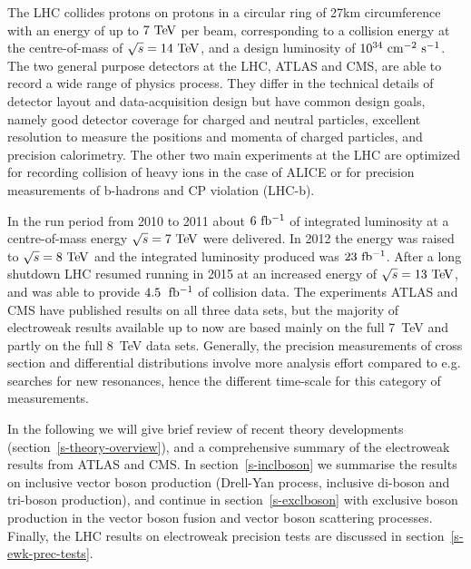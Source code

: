 The LHC collides protons on protons in a circular ring of 27\;km 
circumference with an energy of up to $7\TeV$ per beam, corresponding
to a collision energy at the centre-of-mass of $\rts=14\TeV$, and a 
design luminosity of $10^{34}\cm^{-2}\s^{-1}$. 
The two general purpose detectors at the LHC, ATLAS and CMS, are able to
record a wide range of physics process. They differ in the technical details of detector
layout and data-acquisition design but have common design goals, namely 
good detector coverage for charged and neutral particles, excellent resolution to measure
the positions and momenta of charged particles, and precision calorimetry. The other two
main experiments at the LHC are optimized for recording collision of heavy ions in the 
case of ALICE or for precision measurements of b-hadrons and CP violation (LHC-b).

In the run period from 2010 to 2011 about $6\mbox{\ fb$^{-1}$}$ of integrated
luminosity at a centre-of-mass energy $\rts=7\TeV$ were delivered. In 
2012 the energy was raised to $\rts=8\TeV$ and the integrated luminosity 
produced was $23\mbox{\ fb$^{-1}$}$. 
After a long shutdown LHC resumed running in 2015 at an increased energy of
$\rts=13\TeV$, and was able to provide $4.5\;\mbox{\ fb$^{-1}$}$ of collision data.
The experiments ATLAS and CMS have published results on all three data sets,
but the majority of electroweak results available up to now are based mainly
on the full 7~TeV and partly on the full 8~TeV data sets. Generally, the precision
measurements of cross section and differential distributions involve more analysis
effort compared to e.g. searches for new resonances, hence the different
time-scale for this category	 of measurements. 






In the following we will give brief review 
of recent theory developments (section~\ref{s-theory-overview}), and a comprehensive
summary of the electroweak results from ATLAS and CMS. In section~\ref{s-inclboson} we summarise the
results on inclusive vector boson production (Drell-Yan process, inclusive di-boson and tri-boson production), 
and continue in section~\ref{s-exclboson} with exclusive boson production in the vector boson fusion and vector 
boson scattering processes. Finally, the LHC results on electroweak precision tests are discussed 
in section~\ref{s-ewk-prec-tests}. 


